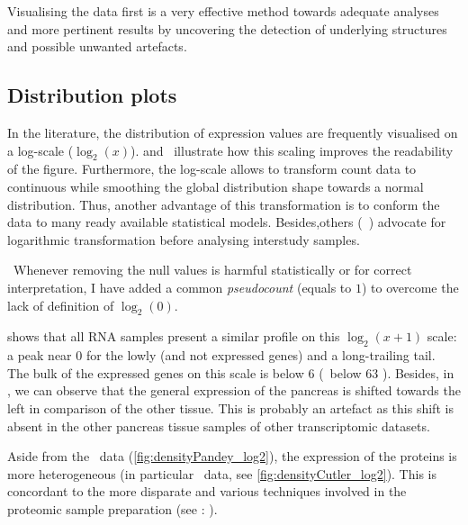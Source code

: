 Visualising the data first is a very effective method towards adequate analyses
and more pertinent results by uncovering
the detection of underlying structures and possible unwanted artefacts.

\subsection{Distribution plots}\label{subsec:distribPlot}

In the literature, the distribution of expression values are frequently
visualised on a log-scale ($\log_{2}(x)$).
 and~ illustrate how
this scaling improves the readability of the figure.
Furthermore, the log-scale allows to transform count data to continuous
while smoothing the global distribution shape towards a normal distribution.
Thus, another advantage of this transformation is to conform the data
to many ready available statistical models.
Besides,others (\eg{}~\cite{Danielsson2015-cn}) advocate
for logarithmic transformation before analysing interstudy samples.

\NB\ Whenever removing the null values is harmful statistically
or for correct interpretation,
I have added a common \emph{pseudocount} (equals to $1$)
to overcome the lack of definition of $\log_{2}(0)$.

 shows that all \gls{RNA} samples present a similar
profile on this $\log_{2}(x+1)$ scale:
a peak near $0$ for the lowly (and not expressed genes) and a long-trailing tail.
The bulk of the expressed genes on this scale is below $6$ (\ie\ below 63 \FPKM).
Besides, in , we can observe that the general expression
of the pancreas is shifted towards the left in comparison of the other tissue.
This is probably an artefact as this shift is absent in the other pancreas
tissue samples of other transcriptomic datasets.

Aside from the \pandey\ data (\cref{fig:densityPandey_log2}),
the expression of the proteins is more heterogeneous
(in particular \cutler\ data, see \cref{fig:densityCutler_log2}).
This is concordant to the more disparate and various techniques involved in
the proteomic sample preparation (see :
).


